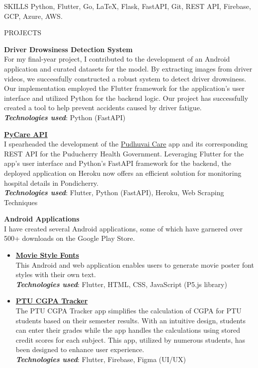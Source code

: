 \documentclass{template}
\begin{document}
\begin{rSection}{SKILLS}
Python, Flutter, Go, \LaTeX, Flask, FastAPI, Git, REST API, Firebase, GCP, Azure, AWS.

\end{rSection}

\begin{rSection}{PROJECTS}

\textbf{Driver Drowsiness Detection System} \\
For my final-year project, I contributed to the development of an Android application and curated datasets for the model. By extracting images from driver videos, we successfully constructed a robust system to detect driver drowsiness. Our implementation employed the Flutter framework for the application's user interface and utilized Python for the backend logic. Our project has successfully created a tool to help prevent accidents caused by driver fatigue. \\
\textbf{\textit{Technologies used}}: Python (FastAPI)

\textbf{\href{https://github.com/princesanjivy/pycare-api}{PyCare API}} \\
I spearheaded the development of the \href{https://sites.google.com/view/dscpec/pudhuvai-care}{Pudhuvai Care} app and its corresponding REST API for the Puducherry Health Government. Leveraging Flutter for the app's user interface and Python's FastAPI framework for the backend, the deployed application on Heroku now offers an efficient solution for monitoring hospital details in Pondicherry. \\
\textbf{\textit{Technologies used}}: Flutter, Python (FastAPI), Heroku, Web Scraping Techniques

\textbf{Android Applications} \\
I have created several Android applications, some of which have garnered over 500+ downloads on the Google Play Store.

\begin{itemize}

\item \textbf{\href{https://github.com/princesanjivy/moviestylefonts}{Movie Style Fonts}} \\ 
This Android and web application enables users to generate movie poster font styles with their own text. \\
\textbf{\textit{Technologies used}}: Flutter, HTML, CSS, JavaScript (P5.js library)

\item \textbf{\href{https://play.google.com/store/apps/details?id=com.princeappstudio.ptu_cgpa_tracker}{PTU CGPA Tracker}} \\ 
The PTU CGPA Tracker app simplifies the calculation of CGPA for PTU students based on their semester results. With an intuitive design, students can enter their grades while the app handles the calculations using stored credit scores for each subject. This app, utilized by numerous students, has been designed to enhance user experience. \\
\textbf{\textit{Technologies used}}: Flutter, Firebase, Figma (UI/UX)


\end{itemize}
\end{rSection}
\end{document}
